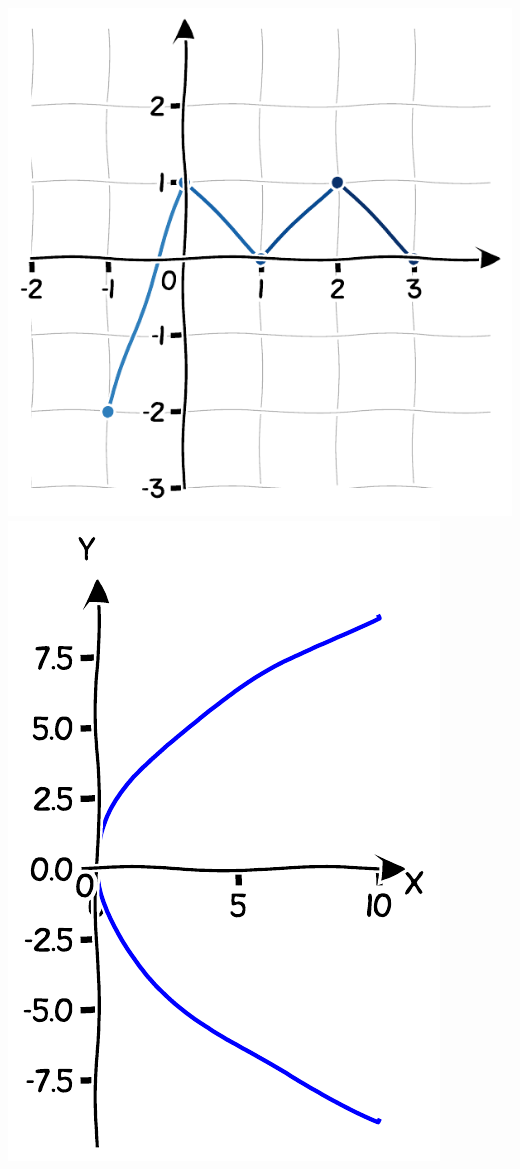 \documentclass[a4paper]{article}
\begin{document}
\begin{minipage}[]{0.4\textwidth}
      \centering
      \includegraphics[scale=0.4]{../graph_drawing/f_function_test_1_1.pdf}
      \captionsetup{labelformat=empty}
      \vspace*{-4mm}
      \label{fig:function_example_1}
      \includegraphics[scale=0.45]{../graph_drawing/sideways_parabola_function_test_1.pdf}
      \captionsetup{labelformat=empty}
      \vspace*{-4mm}
      \label{fig:function_example_2}
\end{minipage}
\end{document}
